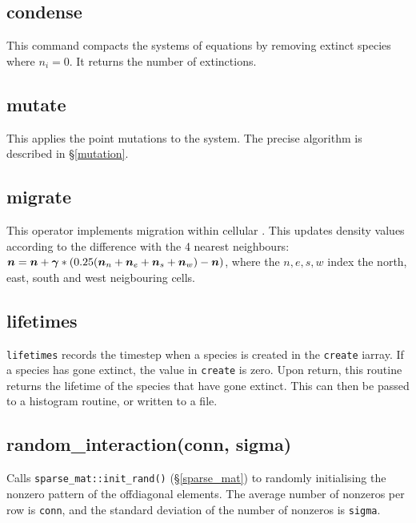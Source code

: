 \documentclass{article}
\newcommand{\bgamma}{\mbox{\boldmath{$\gamma$}}} %
\newcommand{\bn}{\mbox{\boldmath{$n$}}}          %
\newcommand{\EcoLab}{{\sffamily\slshape
    \mbox{\raisebox{.5ex}{Eco}\hspace{-.4em}{\makebox[.5em]{L}ab}}}}
\begin{document}
\subsection{condense}\label{condense}

This command compacts the systems of equations by removing extinct
species where $n_i=0$. It returns the number of extinctions.

\subsection{mutate}\label{mutate}

This applies the point mutations to the system. The precise algorithm
is described in \S\ref{mutation}. 

\subsection{migrate}\label{migrate}

This operator implements migration within cellular \EcoLab{}. This
updates density values according to the difference with the 4 nearest
neighbours: $\bn=\bn+\bgamma*(0.25(\bn_n+\bn_e+\bn_s+\bn_w)-\bn)$, where the
$n,e,s,w$ index the north, east, south and west neigbouring cells.

\subsection{lifetimes}\label{lifetimes}

\verb|lifetimes| records the timestep when a species is created in the
{\tt create} iarray. If a species has gone extinct, the
value in {\tt create} is zero. Upon return, this routine returns the
lifetime of the species that have gone extinct. This can then be
passed to a histogram routine, or written to a file.

\subsection{random\_interaction(conn, sigma)}\label{random_interaction}

Calls {\protect\tt sparse\_mat::init\_rand()} (\S\ref{sparse_mat}) to randomly initialising the nonzero pattern of
the offdiagonal elements. The average number of nonzeros per row is
{\tt conn}, and the standard deviation of the number of nonzeros is
{\tt sigma}.
\end{document}

